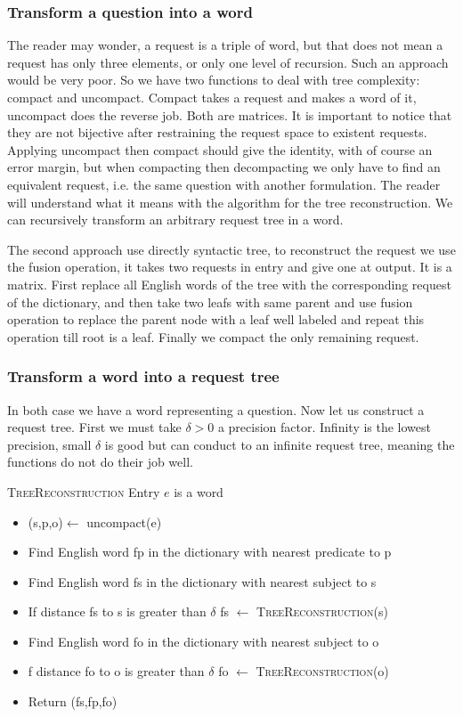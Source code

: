 \subsubsection{Transform a question into a word}

The reader may wonder, a request is a triple of word, but that does not mean a request has only three elements, or only one level of recursion. Such an approach would be very poor. So we have two functions to deal with tree complexity: compact and uncompact. Compact takes a request and makes a word of it, uncompact does the reverse job. Both are matrices. It is important to notice that they are not bijective after restraining the request space to existent requests. Applying uncompact then compact should give the identity, with of course an error margin, but when compacting then decompacting we only have to find an equivalent request, i.e. the same question with another formulation. The reader will understand what it means with the algorithm for the tree reconstruction. We can recursively transform an arbitrary request tree in a word.

The second approach use directly syntactic tree, to reconstruct the request we use the fusion  operation, it takes two requests in entry and give one at output. It is a matrix. First replace all English words of the tree with the corresponding request of the dictionary, and then take two leafs with same parent and use fusion  operation to replace the parent node with a leaf well labeled and repeat this operation till root is a leaf. Finally we compact the only remaining request. 

\subsubsection{Transform a word into a request tree}

In both case we have a word representing a question. Now let us construct a request tree. First we must take $\delta>0$ a precision factor. Infinity is the lowest precision, small $\delta$ is good but can conduct to an infinite request tree, meaning the functions do not do their job well.

\textsc{TreeReconstruction}
Entry $e$ is a word

\begin{itemize}
\item (s,p,o)$\leftarrow$ uncompact(e)
\item Find English word fp in the dictionary with nearest predicate to p
\item Find English word fs in the dictionary with nearest subject to s
\item If distance fs to s is greater than $\delta$ fs $\leftarrow$ \textsc{TreeReconstruction}(s)
\item Find English word fo in the dictionary with nearest subject to o
\item f distance fo to o is greater than $\delta$ fo $\leftarrow$ \textsc{TreeReconstruction}(o)
\item Return (fs,fp,fo)
\end{itemize}


